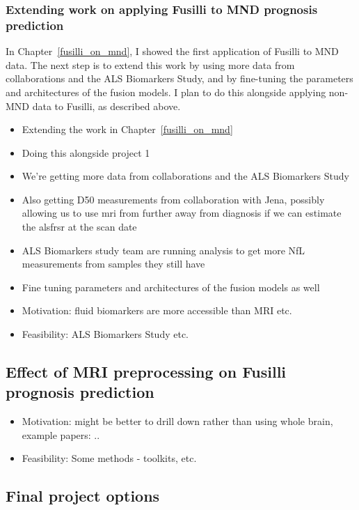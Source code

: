 \subsubsection*{Extending work on applying Fusilli to MND prognosis prediction}

In Chapter~\ref{fusilli_on_mnd}, I showed the first application of Fusilli to MND data.
The next step is to extend this work by using more data from collaborations and the ALS Biomarkers Study, and by fine-tuning the parameters and architectures of the fusion models.
I plan to do this alongside applying non-MND data to Fusilli, as described above.



\begin{itemize}
    \item Extending the work in Chapter~\ref{fusilli_on_mnd}
    \item Doing this alongside project 1
    \item We're getting more data from collaborations and the ALS Biomarkers Study
    \item Also getting D50 measurements from collaboration with Jena, possibly allowing us to use mri from further away from diagnosis if we can estimate the alsfrsr at the scan date
    \item ALS Biomarkers study team are running analysis to get more NfL measurements from samples they still have
    \item Fine tuning parameters and architectures of the fusion models as well
    \item Motivation: fluid biomarkers are more accessible than MRI etc.
    \item Feasibility: ALS Biomarkers Study etc.
\end{itemize}

\subsection{Effect of MRI preprocessing on Fusilli prognosis prediction}
\begin{itemize}
    \item Motivation: might be better to drill down rather than using whole brain, example papers: ..
    \item Feasibility: Some methods - toolkits, etc.
\end{itemize}

\subsection{Final project options}

